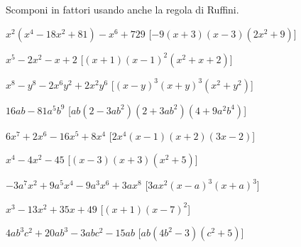 

\begin{esercizio}[\Ast]
 \label{ese:17.24}
 Scomponi in fattori usando anche la regola di Ruffini.
 \begin{enumeratea}
  \item \(x^{2}(x^{4}-18x^{2}+81)-x^{6}+729\)
  \hfill [\(-9(x+3)(x-3)(2x^{2}+9)\)]
\item \(x^{5}-2x^{2}-x+2\)
  \hfill [\((x+1)(x-1)^{2}(x^{2}+x+2)\)]
\item \(x^{8}-y^{8}-2x^{6}y^{2}+2x^{2}y^{6}\)
  \hfill [\((x-y)^{3}(x+y)^{3}(x^{2}+y^{2})\)]
\item \(16ab-81a^{5}b^{9}\)
  \hfill [\({ab}(2-3{ab}^{2})(2+3{ab}^{2})(4+9a^{2}b^{4})\)]
\item \(6x^{7}+2x^{6}-16x^{5}+8x^{4}\)
  \hfill [\(2x^{4}(x-1)(x+2)(3x-2)\)]
\item \(x^{4}-4x^{2}-45\)
  \hfill [\((x-3)(x+3)(x^{2}+5)\)]
\item \(-3a^{7}x^{2}+9a^{5}x^{4}-9a^{3}x^{6}+3ax^{8}\)
  \hfill [\(3ax^{2}(x-a)^{3}(x+a)^{3}\)]
\item \(x^{3}-13x^{2}+35x+49\)
  \hfill [\((x+1)(x-7)^{2}\)]
\item \(4ab^{3}c^{2}+20ab^{3}-3abc^{2}-15ab\)
  \hfill [\({ab}(4b^{2}-3)(c^{2}+5)\)]
 \end{enumeratea}
\end{esercizio}

